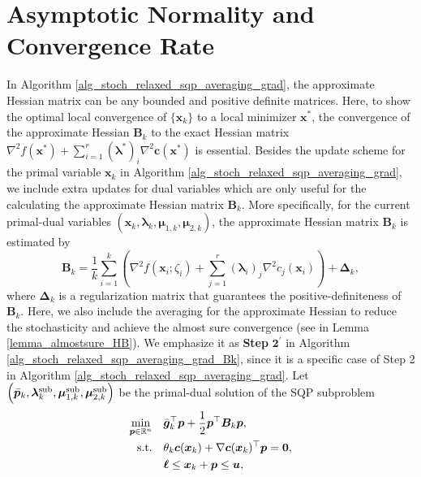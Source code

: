 \documentclass[aos]{imsart}
\numberwithin{equation}{section}
\theoremstyle{plain}
\begin{document}
\section{Asymptotic Normality and Convergence Rate}
\label{sec:asymptotic}
In Algorithm \ref{alg_stoch_relaxed_sqp_averaging_grad}, the approximate Hessian matrix can be any bounded and positive definite matrices. Here, to show the optimal local convergence of $\{\bm{x}_k\}$ to a local minimizer $\bm{x}^{*}$, the convergence of the approximate Hessian $\bm{B}_k$ to the exact Hessian matrix $\nabla^2 f(\bm{x}^{*}) + \sum_{i=1}^{r} (\bm{\lambda}^{*})_{i} \nabla^2 \bm{c}(\bm{x}^{*})$ is essential. Besides the update scheme for the primal variable $\bm{x}_k$ in Algorithm \ref{alg_stoch_relaxed_sqp_averaging_grad}, we include extra updates for dual variables which are only useful for the calculating the approximate Hessian matrix $\bm{B}_k$. More specifically, for the current primal-dual variables $\left(\bm{x}_k, \bm{\lambda}_k, \bm{\mu}_{1,k}, \bm{\mu}_{2,k} \right)$, the approximate Hessian matrix $\bm{B}_k$ is estimated by 
\begin{equation*}
        \bm{B}_k = \frac{1}{k} \sum_{i=1}^{k} \left( \nabla^2 f(\bm{x}_i; \zeta_{i}) + \sum_{j=1}^{r} \left( \bm{\lambda}_{i}\right)_{j}\nabla^2 c_j(\bm{x}_{i})\right) + \bm{\Delta}_k,
\end{equation*}
 where $\bm{\Delta}_k$ is a regularization matrix that guarantees the positive-definiteness of $\bm{B}_k$. Here, we also include the averaging for the approximate Hessian to reduce the stochasticity and achieve the almost sure convergence (see in Lemma \ref{lemma_almostsure_HB}). We emphasize it as \textbf{Step} $\mathbf{2^{\prime}}$ in Algorithm \ref{alg_stoch_relaxed_sqp_averaging_grad_Bk}, since it is a specific case of Step 2 in Algorithm \ref{alg_stoch_relaxed_sqp_averaging_grad}. Let $\left(\Bar{\bm{p}}_k,  \bm{\lambda}_k^{\text{sub}}, \bm{\mu}_{1,k}^{\text{sub}}, \bm{\mu}_{2,k}^{\text{sub}} \right)$ be the primal-dual solution of the SQP subproblem 
 \begin{equation*}
    \begin{split}
        \min_{\bm{p} \in \mathbb{R}^{n}} & \hspace{1em} \Bar{\bm{g}}_{k}^{\top}\bm{p}+ \frac{1}{2}\bm{p}^{\top}\bm{B}_k\bm{p},\\
        \text{s.t.} & \hspace{1em} \theta_k \bm{c}(\bm{x}_k)+\nabla \bm{c}(\bm{x}_k)^{\top}\bm{p} = \bm{0},\\
        & \hspace{1em} \bm{\ell} \leq \bm{x}_k + \bm{p} \leq \bm{u},
    \end{split}    
\end{equation*} 
\end{document}

